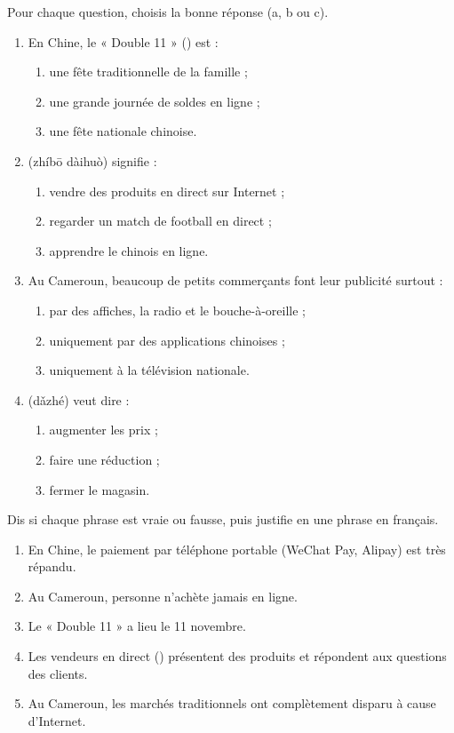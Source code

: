 \documentclass[11pt]{article}
\newcommand{\zh}[1]{\ifmmode\text{#1}\else{#1}\fi}
\begin{document}
\begin{exercice}
Pour chaque question, choisis la bonne réponse (a, b ou c).

\begin{enumerate}
\item En Chine, le « Double 11 » (\zh{双十一}) est :
\begin{enumerate}
\item une fête traditionnelle de la famille ;
\item une grande journée de soldes en ligne ;
\item une fête nationale chinoise.
\end{enumerate}
\item \zh{直播带货} (zhíbō dàihuò) signifie :
\begin{enumerate}
\item vendre des produits en direct sur Internet ;
\item regarder un match de football en direct ;
\item apprendre le chinois en ligne.
\end{enumerate}
\item Au Cameroun, beaucoup de petits commerçants font leur publicité surtout :
\begin{enumerate}
\item par des affiches, la radio et le bouche-à-oreille ;
\item uniquement par des applications chinoises ;
\item uniquement à la télévision nationale.
\end{enumerate}
\item \zh{打折} (dǎzhé) veut dire :
\begin{enumerate}
\item augmenter les prix ;
\item faire une réduction ;
\item fermer le magasin.
\end{enumerate}
\end{enumerate}
\end{exercice}

\begin{exercice}
Dis si chaque phrase est vraie ou fausse, puis justifie en une phrase en français.

\begin{enumerate}
\item En Chine, le paiement par téléphone portable (WeChat Pay, Alipay) est très répandu.
\item Au Cameroun, personne n'achète jamais en ligne.
\item Le « Double 11 » a lieu le 11 novembre.
\item Les vendeurs en direct (\zh{主播}) présentent des produits et répondent aux questions des clients.
\item Au Cameroun, les marchés traditionnels ont complètement disparu à cause d'Internet.
\end{enumerate}
\end{exercice}
\end{document}
